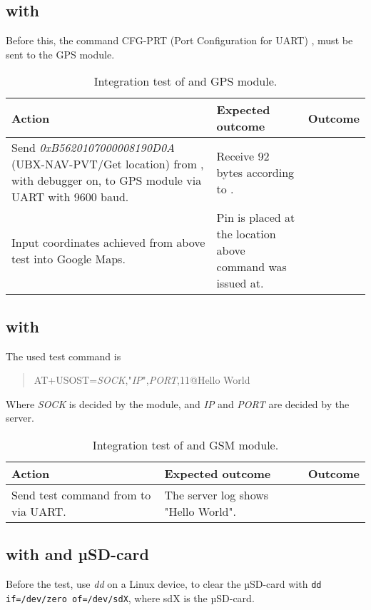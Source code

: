 \subsection{\MKR with \GPS}
Before this, the command CFG-PRT (Port Configuration for UART) \cite[p.~119-120]{NEO7_proto}, must be sent to the GPS module.

\begin{table}[H]
	\centering
	\begin{tabularx}{\textwidth}{p{4.3cm} X X}
		\toprule
		\textbf{Action} & \textbf{Expected outcome} & \textbf{Outcome} \\
		\midrule
		Send \textit{0xB5620107000008190D0A} (UBX-NAV-PVT/Get location) from \MKR, with debugger on, to GPS module via UART with \num{9600} baud. & Receive \num{92} bytes according to \cite[p.~160-161]{NEO7_proto}. & \\
		\midrule
		Input coordinates achieved from above test into Google Maps. & Pin is placed at the location above command was issued at. & \\
		\bottomrule
	\end{tabularx}
	\caption{Integration test of \MKR and \GPS GPS module.}
	\label{AT:intGPS}
\end{table}

\subsection{\MKR with \SARA}
The used test command is
\begin{quote}
	AT+USOST=\textit{SOCK},"\textit{IP}",\textit{PORT},11@Hello World
\end{quote}
Where \textit{SOCK} is decided by the \SARA module, and \textit{IP} and \textit{PORT} are decided by the server.

\begin{table}[H]
	\centering
	\begin{tabularx}{\textwidth}{p{4.3cm} X X}
		\toprule
		\textbf{Action} & \textbf{Expected outcome} & \textbf{Outcome} \\
		\midrule
		Send test command from \MKR to \SARA via UART. & The server log shows "Hello World". & \\
		\bottomrule
	\end{tabularx}
	\caption{Integration test of \MKR and \SARA GSM module.}
	\label{AT:intGSM}
\end{table}

\subsection{\MKR with \SDsock and µSD-card}
Before the test, use \textit{dd} on a Linux device, to clear the µSD-card with \texttt{dd if=/dev/zero of=/dev/sdX}, where sdX is the µSD-card.

